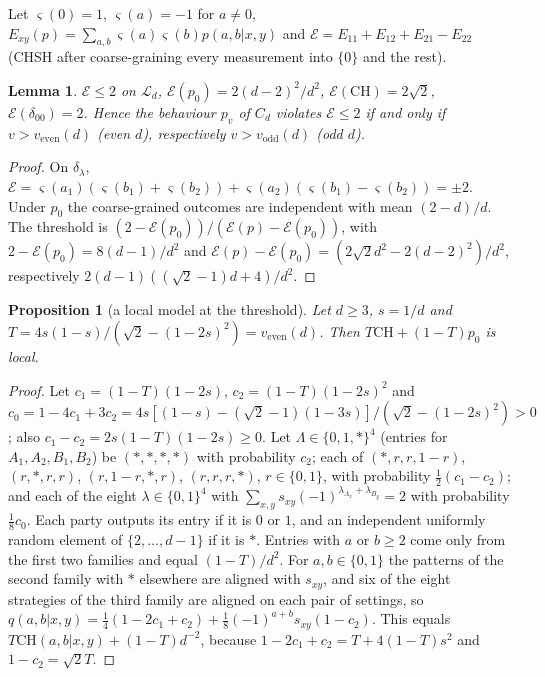 \documentclass[11pt]{amsart}
\newtheorem{lemma}[theorem]{Lemma}
\newtheorem{proposition}[theorem]{Proposition}
\theoremstyle{definition}
\theoremstyle{remark}
\numberwithin{equation}{section}
\newcommand{\cL}{\mathcal{L}}
\newcommand{\veven}{v_{\mathrm{even}}}
\newcommand{\vodd}{v_{\mathrm{odd}}}
\newcommand{\CH}{\mathrm{CH}}
\begin{document}
Let $\varsigma(0)=1$, $\varsigma(a)=-1$ for $a\ne0$, $E_{xy}(p)=\sum_{a,b}\varsigma(a)\varsigma(b)p(a,b|x,y)$ and
$\mathcal E=E_{11}+E_{12}+E_{21}-E_{22}$ (CHSH after coarse-graining every measurement into $\{0\}$ and the rest).

\begin{lemma}\label{lem:witness}
$\mathcal E\le2$ on $\cL_d$, $\mathcal E(p_0)=2(d-2)^2/d^2$, $\mathcal E(\CH)=2\sqrt2$, $\mathcal E(\delta_{00})=2$.
Hence the behaviour $p_v$ of $C_d$ violates $\mathcal E\le2$ if and only if $v>\veven(d)$ (even $d$), respectively
$v>\vodd(d)$ (odd $d$).
\end{lemma}

\begin{proof}
On $\delta_\lambda$, $\mathcal E=\varsigma(a_1)(\varsigma(b_1)+\varsigma(b_2))+\varsigma(a_2)(\varsigma(b_1)-\varsigma(b_2))=\pm2$.
Under $p_0$ the coarse-grained outcomes are independent with mean $(2-d)/d$. The threshold is
$(2-\mathcal E(p_0))/(\mathcal E(p)-\mathcal E(p_0))$, with $2-\mathcal E(p_0)=8(d-1)/d^2$ and
$\mathcal E(p)-\mathcal E(p_0)=(2\sqrt2d^2-2(d-2)^2)/d^2$, respectively $2(d-1)((\sqrt2-1)d+4)/d^2$.
\end{proof}

\begin{proposition}[a local model at the threshold]\label{prop:flagmodel}
Let $d\ge3$, $s=1/d$ and $T=4s(1-s)/(\sqrt2-(1-2s)^2)=\veven(d)$. Then $T\CH+(1-T)p_0$ is local.
\end{proposition}

\begin{proof}
Let $c_1=(1-T)(1-2s)$, $c_2=(1-T)(1-2s)^2$ and $c_0=1-4c_1+3c_2=4s[(1-s)-(\sqrt2-1)(1-3s)]/(\sqrt2-(1-2s)^2)>0$; also
$c_1-c_2=2s(1-T)(1-2s)\ge0$. Let $\Lambda\in\{0,1,\ast\}^4$ (entries for $A_1,A_2,B_1,B_2$) be $(\ast,\ast,\ast,\ast)$ with
probability $c_2$; each of $(\ast,r,r,1-r)$, $(r,\ast,r,r)$, $(r,1-r,\ast,r)$, $(r,r,r,\ast)$, $r\in\{0,1\}$, with
probability $\frac12(c_1-c_2)$; and each of the eight $\lambda\in\{0,1\}^4$ with
$\sum_{x,y}s_{xy}(-1)^{\lambda_{A_x}+\lambda_{B_y}}=2$ with probability $\frac18c_0$. Each party outputs its entry if it is
$0$ or $1$, and an independent uniformly random element of $\{2,\dots,d-1\}$ if it is $\ast$. Entries with $a$ or
$b\ge2$ come only from the first two families and equal $(1-T)/d^2$. For $a,b\in\{0,1\}$ the patterns of the second
family with $\ast$ elsewhere are aligned with $s_{xy}$, and six of the eight strategies of the third family are aligned
on each pair of settings, so $q(a,b|x,y)=\frac14(1-2c_1+c_2)+\frac18(-1)^{a+b}s_{xy}(1-c_2)$. This equals
$T\CH(a,b|x,y)+(1-T)d^{-2}$, because $1-2c_1+c_2=T+4(1-T)s^2$ and $1-c_2=\sqrt2T$.
\end{proof}
\end{document}
